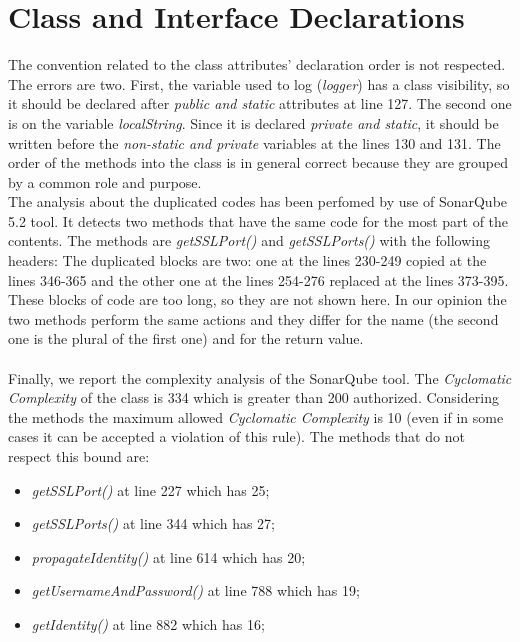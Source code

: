 \documentclass[\mainpath/main]{subfiles}
\begin{document}
\section{Class and Interface Declarations}
\label{CodeInspectionChecklist:ClassandInterfaceDeclarations}
The convention related to the class attributes' declaration order is not respected. The errors are two. First, the variable used to log (\textit{\textunderscore logger}) has a class visibility, so it should be declared after \textit{public and static} attributes at line 127.
The second one is on the variable \textit{localString}. Since it is declared \textit{private and static}, it should be written before the \textit{non-static and private} variables at the lines 130 and 131.
The order of the methods into the class is in general correct because they are grouped by a common role and purpose.\\
The analysis about the duplicated codes has been perfomed by use of SonarQube 5.2 tool. It detects two methods that have the same code for the most part of the contents. The methods are \textit{getSSLPort(\textellipsis)} and \textit{getSSLPorts(\textellipsis)} with the following headers:
The duplicated blocks are two: one at the lines 230-249 copied at the lines 346-365 and the other one at the lines 254-276 replaced at the lines 373-395. These blocks of code are too long, so they are not shown here. In our opinion the two methods perform the same actions and they differ for the name (the second one is the plural of the first one) and for the return value.\\
\\
Finally, we report the complexity analysis of the SonarQube tool. The \textit{Cyclomatic Complexity} of the class is 334 which is greater than 200 authorized. Considering the methods the maximum allowed \textit{Cyclomatic Complexity} is 10 (even if in some cases it can be accepted a violation of this rule). The methods that do not respect this bound are:
\begin{itemize}
	\item \textit{getSSLPort(\textellipsis)} at line 227 which has 25;
	\item \textit{getSSLPorts(\textellipsis)} at line 344 which has 27;
	\item \textit{propagateIdentity(\textellipsis)} at line 614 which has 20;
	\item \textit{getUsernameAndPassword(\textellipsis)} at line 788 which has 19;
	\item \textit{getIdentity()} at line 882 which has 16;
\end{itemize}
\end{document}

